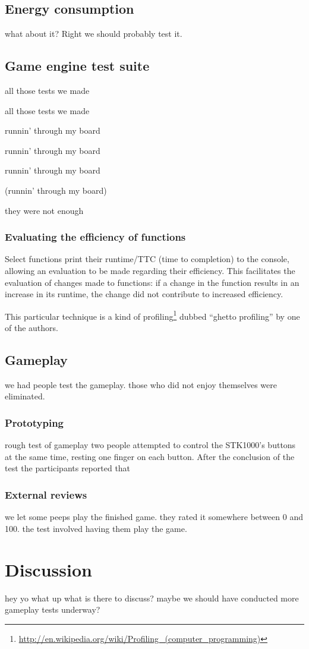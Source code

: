 \subsection{Energy consumption}
	what about it? Right we should probably test it.

\subsection{Game engine test suite}
	all those tests we made

	all those tests we made

	runnin' through my board

	runnin' through my board

	runnin' through my board

	(runnin' through my board)

	they were not enough
	\subsubsection{Evaluating the efficiency of functions}
		Select functions print their runtime/TTC (time to completion) to the console, allowing an evaluation to be made regarding their efficiency.
		This facilitates the evaluation of changes made to functions: if a change in the function results in an increase in its runtime, the change did not contribute to increased efficiency.

		This particular technique is a kind of profiling\footnote{\url{http://en.wikipedia.org/wiki/Profiling_(computer_programming)}} dubbed ``ghetto profiling'' by one of the authors. 

\subsection{Gameplay}
	we had people test the gameplay.
	those who did not enjoy themselves were eliminated.
	\subsubsection{Prototyping}
		rough test of gameplay
		two people attempted to control the STK1000's buttons at the same time, resting one finger on each button.
		After the conclusion of the test the participants reported that 
	\subsubsection{External reviews}
		we let some peeps play the finished game.
		they rated it somewhere between 0 and 100.
		the test involved having them play the game.


\section{Discussion}
	hey yo what up what is there to discuss?
	maybe we should have conducted more gameplay tests underway?